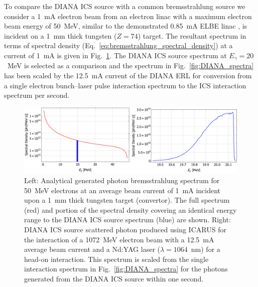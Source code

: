 \documentclass[../main.tex]{subfiles}
\begin{document}
To compare the DIANA ICS source with a common bremsstrahlung source we consider a 1~\si{\milli\ampere} electron beam from an electron linac with a maximum electron beam energy of 50~\si{\mega\electronvolt}, similar to the demonstrated 0.85~\si{\milli\ampere} ELBE linac \cite{teichert2003results}, is incident on a 1~\si{\milli\meter} thick tungsten ($Z = 74$) target. The resultant spectrum in terms of spectral density (Eq.~\ref{eq:bremsstrahlung_spectral_density}) at a current of 1~\si{\milli\ampere} is given in Fig.~\ref{fig:brem_1mA_DIANA_ICS_comparison}. The DIANA ICS source spectrum at $E_{\gamma} = 20$~\si{\mega\electronvolt} is selected as a comparison and the spectrum in Fig.~\ref{fig:DIANA_spectra} has been scaled by the 12.5~\si{\milli\ampere} current of the DIANA ERL for conversion from a single electron bunch--laser pulse interaction spectrum to the ICS interaction spectrum per second.
\begin{figure}[!h]
\centering
\includegraphics[width=\textwidth]{Figures/DIANA_Inverse_Compton_Source_Design/Brem_1mA_DIANA_ICS_Comparison.pdf}
\caption{Left: Analytical generated photon bremsstrahlung spectrum for 50~\si{\mega\electronvolt} electrons at an average beam current of 1~\si{\milli\ampere} incident upon a 1~\si{\milli\meter} thick tungsten target (convertor). The full spectrum (red) and portion of the spectral density covering an identical energy range to the DIANA ICS source spectrum (blue) are shown. Right: DIANA ICS source scattered photon produced using \textsc{ICARUS} for the interaction of a 1072~\si{\mega\electronvolt} electron beam with a 12.5~\si{\milli\ampere} average beam current and a Nd:YAG laser ($\lambda=1064$~\si{\nano\meter}) for a head-on interaction. This spectrum is scaled from the single interaction spectrum in Fig.~\ref{fig:DIANA_spectra} for the photons generated from the DIANA ICS source within one second.}
\label{fig:brem_1mA_DIANA_ICS_comparison}
\end{figure}
\end{document}
